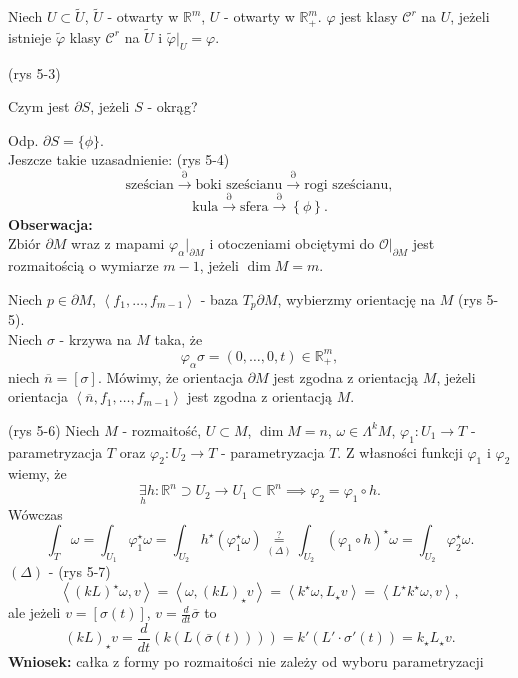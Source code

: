 \documentclass[../main.tex]{subfiles}
\begin{document}
\begin{definicja}
    Niech $U\subset \tilde U$, $\tilde U$ - otwarty w $\mathbb{R}^m$, $U$ - otwarty w $\mathbb{R}^m_+$. $\varphi$ jest klasy $\mathcal{C}^r$ na $U$, jeżeli istnieje $\tilde \varphi$ klasy $\mathcal{C}^r$ na $\tilde U$ i $\tilde \varphi|_U = \varphi$.
\end{definicja}
(rys 5-3)
\begin{pytanie}
    Czym jest $\partial S$, jeżeli $S$ - okrąg?
\end{pytanie}
Odp. $\partial S = \{\phi\}$.\\
Jeszcze takie uzasadnienie: (rys 5-4)
\[
    \text{sześcian} \overset{\partial}{\to} \text{boki sześcianu} \overset{\partial}{\to} \text{rogi sześcianu}
,\]
\[
    \text{kula} \overset{\partial}{\to} \text{sfera} \overset{\partial}{\to} \left\{ \phi \right\}
.\]
\textbf{Obserwacja:}\\
Zbiór $\partial M$ wraz z mapami $\varphi_\alpha|_{\partial M}$ i otoczeniami obciętymi do $\mathcal{O}|_{\partial M}$ jest rozmaitością o wymiarze $m-1$, jeżeli $\dim M = m$.\\

\begin{definicja}
Niech  $p\in \partial M$, $\left<f_1,\ldots,f_{m-1} \right>$ - baza $ T_p\partial M$, wybierzmy orientację na $M$ (rys 5-5).\\
Niech $\sigma$ - krzywa na $M$ taka, że
\[
    \varphi_\alpha\sigma =  \left( 0,\ldots,0,t \right) \in\mathbb{R}^m_+
,\]
niech $\overline{n} = \left[ \sigma \right] $. Mówimy, że orientacja $\partial M$ jest zgodna z orientacją $M$, jeżeli orientacja $\left<\overline{n}, f_1,\ldots,f_{m-1} \right>$ jest zgodna z orientacją $M$.
\end{definicja}
(rys 5-6)
Niech $M$ - rozmaitość, $U\subset M$, $\dim M = n$, $\omega\in \Lambda^kM$,  $\varphi_1: U_1\to T$ - parametryzacja $T$ oraz $\varphi_2: U_2\to T$ - parametryzacja $T$. Z własności funkcji  $\varphi_1$ i $\varphi_2$ wiemy, że
\[
\underset{h}{\exists} h: \mathbb{R}^n \supset U_2\to U_1\subset\mathbb{R}^n \implies \varphi_2 = \varphi_1\circ h
.\]
Wówczas
\[
    \int_{T}\omega = \int_{U_1}\varphi_1^\star \omega = \int_{U_2}h^\star\left( \varphi_1^\star\omega \right) \underset{(\Delta)}{\overset{\text{?}}{=}} \int_{U_2}(\varphi_1\circ h)^\star\omega = \int_{U_2}\varphi_2^\star\omega
.\]
    $(\Delta)$ - (rys 5-7)
    \[
        \left<(kL)^\star\omega, v \right> = \left<\omega, (kL)_\star v \right> = \left<k^\star \omega, L_\star v \right> = \left<L^\star k^\star \omega, v \right>
    ,\]
ale jeżeli $v = \left[ \sigma(t) \right]$, $v = \frac{d}{dt}\overline{\sigma}$ to
\[
    (kL)_\star v = \frac{d}{dt}\left( k\left( L\left( \overline{\sigma}(t) \right)  \right)  \right) = k'(L'\cdot \sigma'(t)) = k_\star L_\star v
.\]
\textbf{Wniosek:} całka z formy po rozmaitości nie zależy od wyboru parametryzacji
\end{document}
